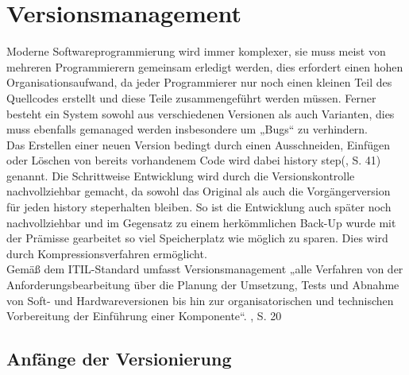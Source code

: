\chapter{Versionsmanagement}

Moderne Softwareprogrammierung wird immer komplexer, sie muss meist von mehreren Programmierern gemeinsam erledigt werden, dies erfordert einen hohen Organisationsaufwand, da jeder Programmierer nur noch einen kleinen Teil des Quellcodes erstellt und diese Teile zusammengeführt werden müssen. Ferner besteht ein System sowohl aus verschiedenen Versionen als auch Varianten, dies muss ebenfalls gemanaged werden insbesondere um „Bugs“ zu verhindern.
\\
Das Erstellen einer neuen Version bedingt durch einen Ausschneiden, Einfügen oder Löschen von bereits vorhandenem Code wird dabei \Gu history step\Go (\cite{cm_vc}, S. 41) genannt. 
Die Schrittweise Entwicklung wird durch die Versionskontrolle nachvollziehbar gemacht, da sowohl das Original als auch die Vorgängerversion für jeden \Gu history step\Go erhalten bleiben. So ist die Entwicklung auch später noch nachvollziehbar und im Gegensatz zu einem herkömmlichen Back-Up wurde mit der Prämisse gearbeitet so viel Speicherplatz wie möglich zu sparen. Dies wird durch Kompressionsverfahren ermöglicht. \cite{itil_infosec}
\\
Gemäß dem ITIL-Standard umfasst Versionsmanagement „alle Verfahren von der Anforderungsbearbeitung über die Planung der Umsetzung, Tests und Abnahme von Soft- und Hardwareversionen bis hin zur organisatorischen und technischen Vorbereitung der Einführung einer Komponente“. \cite{itil_infosec}, S. 20

\section{Anfänge der Versionierung}

